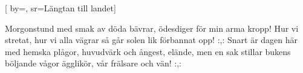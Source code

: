 [
    by={},
    sr={Längtan till landet}]

\beginverse
Morgonstund med smak av döda bävrar,
ödesdiger för min arma kropp!
Hur vi stretat, hur vi alla vägrar
så går solen lik förbannat opp!
:,: Snart är dagen här med hemska plågor,
huvudvärk och ångest, elände, men
en sak stillar bukens böljande vågor
ägglikör, vår frälsare och vän! :,:
\endverse

\vspace{5mm}
\endsong